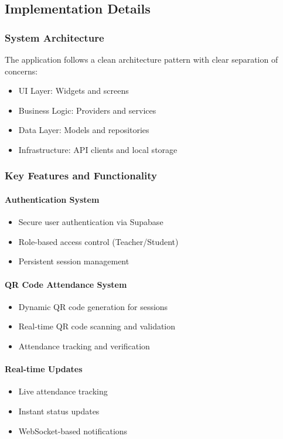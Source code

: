 \clearpage
\subsection{Implementation Details}

\subsubsection{System Architecture}
The application follows a clean architecture pattern with clear separation of concerns:
\begin{itemize}
    \item UI Layer: Widgets and screens
    \item Business Logic: Providers and services
    \item Data Layer: Models and repositories
    \item Infrastructure: API clients and local storage
\end{itemize}

\subsubsection{Key Features and Functionality}

\paragraph{Authentication System}
\begin{itemize}
    \item Secure user authentication via Supabase
    \item Role-based access control (Teacher/Student)
    \item Persistent session management
\end{itemize}

\paragraph{QR Code Attendance System}
\begin{itemize}
    \item Dynamic QR code generation for sessions
    \item Real-time QR code scanning and validation
    \item Attendance tracking and verification
\end{itemize}

\paragraph{Real-time Updates}
\begin{itemize}
    \item Live attendance tracking
    \item Instant status updates
    \item WebSocket-based notifications
\end{itemize}

